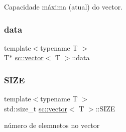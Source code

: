 Capacidade máxima (atual) do vector. 

\mbox{\label{classsc_1_1vector_ab0607397430a55a5a484dfea79867467}} 
\subsubsection{\texorpdfstring{data}{data}}
{\footnotesize\ttfamily template$<$typename T $>$ \\
T$\ast$ \hyperlink{classsc_1_1vector}{sc\+::vector}$<$ T $>$\+::data\hspace{0.3cm}{\ttfamily [private]}}

\mbox{\label{classsc_1_1vector_ad6729b20ad502c5fdf480fec848476f6}} 
\subsubsection{\texorpdfstring{S\+I\+ZE}{SIZE}}
{\footnotesize\ttfamily template$<$typename T $>$ \\
std\+::size\+\_\+t \hyperlink{classsc_1_1vector}{sc\+::vector}$<$ T $>$\+::S\+I\+ZE\hspace{0.3cm}{\ttfamily [private]}}



número de elemnetos no vector 

